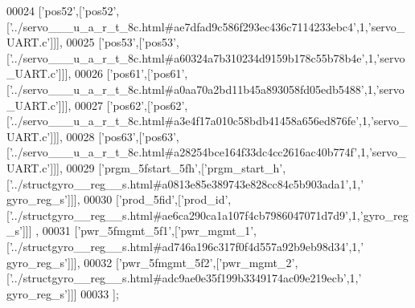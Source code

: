 \begin{DoxyCode}
00024   [\textcolor{stringliteral}{'pos52'},[\textcolor{stringliteral}{'pos52'},[\textcolor{stringliteral}{'../servo\_\_\_u\_a\_r\_t\_8c.html#ae7dfad9c586f293ec436c7114233ebc4'},1,\textcolor{stringliteral}{'servo\_UART.c'}]]],
00025   [\textcolor{stringliteral}{'pos53'},[\textcolor{stringliteral}{'pos53'},[\textcolor{stringliteral}{'../servo\_\_\_u\_a\_r\_t\_8c.html#a60324a7b310234d9159b178c55b78b4e'},1,\textcolor{stringliteral}{'servo\_UART.c'}]]],
00026   [\textcolor{stringliteral}{'pos61'},[\textcolor{stringliteral}{'pos61'},[\textcolor{stringliteral}{'../servo\_\_\_u\_a\_r\_t\_8c.html#a0aa70a2bd11b45a893058fd05edb5488'},1,\textcolor{stringliteral}{'servo\_UART.c'}]]],
00027   [\textcolor{stringliteral}{'pos62'},[\textcolor{stringliteral}{'pos62'},[\textcolor{stringliteral}{'../servo\_\_\_u\_a\_r\_t\_8c.html#a3e4f17a010c58bdb41458a656ed876fe'},1,\textcolor{stringliteral}{'servo\_UART.c'}]]],
00028   [\textcolor{stringliteral}{'pos63'},[\textcolor{stringliteral}{'pos63'},[\textcolor{stringliteral}{'../servo\_\_\_u\_a\_r\_t\_8c.html#a28254bce164f33dc4cc2616ac40b774f'},1,\textcolor{stringliteral}{'servo\_UART.c'}]]],
00029   [\textcolor{stringliteral}{'prgm\_5fstart\_5fh'},[\textcolor{stringliteral}{'prgm\_start\_h'},[\textcolor{stringliteral}{'../structgyro\_\_reg\_\_s.html#a0813e85e389743e828cc84c5b903ada1'},1,\textcolor{stringliteral}{'
      gyro\_reg\_s'}]]],
00030   [\textcolor{stringliteral}{'prod\_5fid'},[\textcolor{stringliteral}{'prod\_id'},[\textcolor{stringliteral}{'../structgyro\_\_reg\_\_s.html#ae6ca290ca1a107f4cb7986047071d7d9'},1,\textcolor{stringliteral}{'gyro\_reg\_s'}]]]
      ,
00031   [\textcolor{stringliteral}{'pwr\_5fmgmt\_5f1'},[\textcolor{stringliteral}{'pwr\_mgmt\_1'},[\textcolor{stringliteral}{'../structgyro\_\_reg\_\_s.html#ad746a196c317f0f4d557a92b9eb98d34'},1,\textcolor{stringliteral}{'
      gyro\_reg\_s'}]]],
00032   [\textcolor{stringliteral}{'pwr\_5fmgmt\_5f2'},[\textcolor{stringliteral}{'pwr\_mgmt\_2'},[\textcolor{stringliteral}{'../structgyro\_\_reg\_\_s.html#adc9ae0e35f199b3349174ac09e219ecb'},1,\textcolor{stringliteral}{'
      gyro\_reg\_s'}]]]
00033 ];
\end{DoxyCode}
